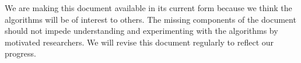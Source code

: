 \documentclass{report}
\begin{document}
We are making this document available in its current form because we
think the algorithms will be of interest to others. The missing
components of the document should not impede understanding and
experimenting with the algorithms by motivated researchers. We will
revise this document regularly to reflect our progress.

\tableofcontents









\appendix




\end{document}
